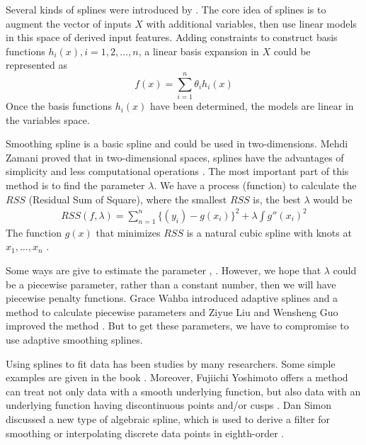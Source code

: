 Several kinds of splines were introduced by \cite{esl2009}. The core idea of splines is to augment the vector of inputs $X$ with additional variables, then use linear models in this space of derived input features. Adding constraints to construct basis functions $h_i(x), i = 1, 2,\ldots, n$, a linear basis expansion in $X$ could be represented as
\begin{equation*}
f(x)=\sum_{i=1}^n \theta_i h_i(x) 
\end{equation*}
Once the basis functions $h_i(x)$ have been determined, the models are linear in the variables space. 

Smoothing spline is a basic spline and could be used in two-dimensions. Mehdi Zamani proved that in two-dimensional spaces, splines have the advantages of simplicity and less computational operations \cite{zamani2010simple}. The most important part of this method is to find the parameter $\lambda$. We have a process (function)  to calculate the $RSS$ (Residual Sum of Square), where the smallest $RSS$ is, the best $\lambda$ would be
\begin{align*}
RSS(f,\lambda)=\sum_{n=1}^{n}\{(y_i)-g(x_i)\}^2+\lambda\int g''(x_i)^2
\end{align*}
The function $g(x)$ that minimizes $RSS$ is a natural cubic spline with knots at $x_1,\ldots ,x_n$ \cite{esl2009}. 

Some ways are give to estimate the parameter \cite{wood2000modelling}, \cite{kim2004smoothing}. However, we hope that $\lambda$ could be a piecewise parameter, rather than a constant number, then we will have piecewise penalty functions. Grace Wahba introduced adaptive splines and a method to calculate piecewise parameters \cite{donoho1995wavelet} and Ziyue Liu and Wensheng Guo improved the method \cite{liu2010data}. But to get these parameters, we have to compromise to use adaptive smoothing splines. 

Using splines to fit data has been studies by many researchers. Some simple examples are given in the book \cite{esl2009}. Moreover, Fujiichi Yoshimoto offers a method can treat not only data with a smooth underlying function, but also data with an underlying function having discontinuous points and/or cusps \cite{yoshimoto2003data}. Dan Simon discussed a new type of algebraic spline, which is used to derive a filter for smoothing or interpolating discrete data points in eighth-order \cite{simon2004data}.

